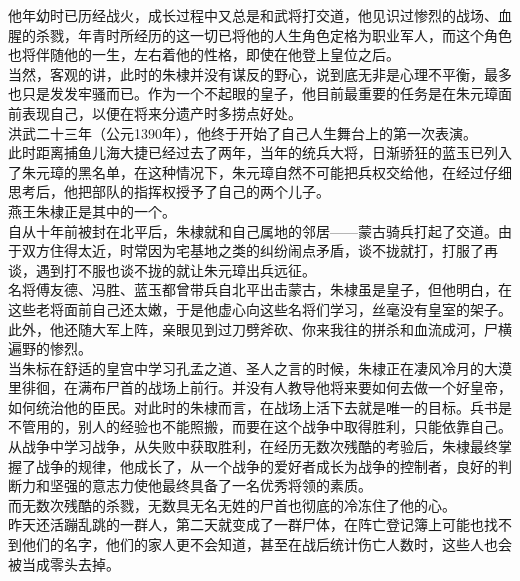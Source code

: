 \begin{multicols}{\theparacolNo}
他年幼时已历经战火，成长过程中又总是和武将打交道，他见识过惨烈的战场、血腥的杀戮，年青时所经历的这一切已将他的人生角色定格为职业军人，而这个角色也将伴随他的一生，左右着他的性格，即使在他登上皇位之后。\\

当然，客观的讲，此时的朱棣并没有谋反的野心，说到底无非是心理不平衡，最多也只是发发牢骚而已。作为一个不起眼的皇子，他目前最重要的任务是在朱元璋面前表现自己，以便在将来分遗产时多捞点好处。\\

洪武二十三年（公元1390年），他终于开始了自己人生舞台上的第一次表演。\\

此时距离捕鱼儿海大捷已经过去了两年，当年的统兵大将，日渐骄狂的蓝玉已列入了朱元璋的黑名单，在这种情况下，朱元璋自然不可能把兵权交给他，在经过仔细思考后，他把部队的指挥权授予了自己的两个儿子。\\

燕王朱棣正是其中的一个。\\

自从十年前被封在北平后，朱棣就和自己属地的邻居——蒙古骑兵打起了交道。由于双方住得太近，时常因为宅基地之类的纠纷闹点矛盾，谈不拢就打，打服了再谈，遇到打不服也谈不拢的就让朱元璋出兵远征。\\

名将傅友德、冯胜、蓝玉都曾带兵自北平出击蒙古，朱棣虽是皇子，但他明白，在这些老将面前自己还太嫩，于是他虚心向这些名将们学习，丝毫没有皇室的架子。此外，他还随大军上阵，亲眼见到过刀劈斧砍、你来我往的拼杀和血流成河，尸横遍野的惨烈。\\

当朱标在舒适的皇宫中学习孔孟之道、圣人之言的时候，朱棣正在凄风冷月的大漠里徘徊，在满布尸首的战场上前行。并没有人教导他将来要如何去做一个好皇帝，如何统治他的臣民。对此时的朱棣而言，在战场上活下去就是唯一的目标。兵书是不管用的，别人的经验也不能照搬，而要在这个战争中取得胜利，只能依靠自己。\\

从战争中学习战争，从失败中获取胜利，在经历无数次残酷的考验后，朱棣最终掌握了战争的规律，他成长了，从一个战争的爱好者成长为战争的控制者，良好的判断力和坚强的意志力使他最终具备了一名优秀将领的素质。\\

而无数次残酷的杀戮，无数具无名无姓的尸首也彻底的冷冻住了他的心。\\

昨天还活蹦乱跳的一群人，第二天就变成了一群尸体，在阵亡登记簿上可能也找不到他们的名字，他们的家人更不会知道，甚至在战后统计伤亡人数时，这些人也会被当成零头去掉。\\


\end{multicols}
